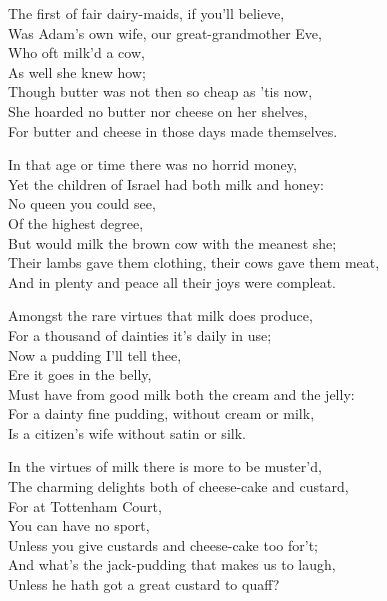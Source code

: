 
\pagebreak

\begin{scverse}\begin{patverse}
The first of fair dairy-maids, if you’ll believe,\\
Was Adam’s own wife, our great-grandmother Eve,\\
Who oft milk’d a cow,\\
As well she knew how;\\
Though butter was not then so cheap as ’tis now,\\
She hoarded no butter nor cheese on her shelves,\\
For butter and cheese in those days made themselves.
\end{patverse}

\begin{patverse}
In that age or time there was no horrid money,\\
Yet the children of Israel had both milk and honey:\\
No queen you could see,\\
Of the highest degree,\\
But would milk the brown cow with the meanest she;\\
Their lambs gave them clothing, their cows gave them meat,\\
And in plenty and peace all their joys were compleat.
\end{patverse}

\begin{patverse}
Amongst the rare virtues that milk does produce,\\
For a thousand of dainties it’s daily in use;\\
Now a pudding I’ll tell thee,\\
Ere it goes in the belly,\\
Must have from good milk both the cream and the jelly:\\
For a dainty fine pudding, without cream or milk,\\
Is a citizen's wife without satin or silk.
\end{patverse}

\begin{patverse}
In the virtues of milk there is more to be muster’d,\\
The charming delights both of cheese-cake and custard,\\
For at Tottenham Court,\\
You can have no sport,\\
Unless you give custards and cheese-cake too for’t;\\
And what's the jack-pudding that makes us to laugh,\\
Unless he hath got a great custard to quaff?
\end{patverse}


\end{scverse}
